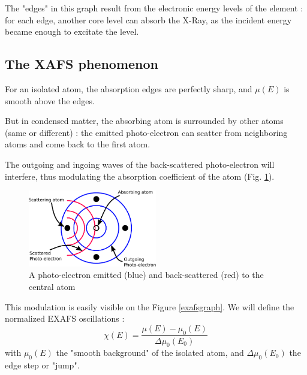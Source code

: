 \documentclass[11pt,a4paper,oneside]{report}
\begin{document}
The "edges" in this graph result from the electronic energy levels of the element : for each edge, another core level can absorb the X-Ray, as the incident energy became enough to excitate the level.

\subsection{The XAFS phenomenon}
For an isolated atom, the absorption edges are perfectly sharp, and $\mu(E)$ is smooth above the edges.

But in condensed matter, the absorbing atom is surrounded by other atoms (same or different) : the emitted photo-electron can scatter from neighboring atoms and come back to the first atom.

The outgoing and ingoing waves of the back-scattered photo-electron will interfere, thus modulating the absorption coefficient of the atom (Fig. \ref{scatteringschema}).
\begin{figure}[H]
    \begin{center}
        \includegraphics[width=0.5\textwidth]{Images/Scattering}
        \caption{A photo-electron emitted (blue) and back-scattered (red) to the central atom}
        \label{scatteringschema}
    \end{center}
\end{figure}

This modulation is easily visible on the Figure \ref{exafsgraph}. We will define the normalized EXAFS oscillations :
\[\chi(E) = \frac{\mu(E) - \mu_0(E)}{\Delta\mu_0(E_0)}\]
with $\mu_0(E)$ the "smooth background" of the isolated atom, and $\Delta\mu_0(E_0)$ the edge step or "jump".
\end{document}

